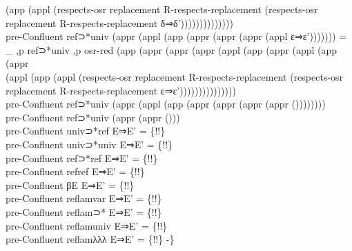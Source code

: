{\begin{code}
{\>  (app (appl (respects-osr replacement R-respects-replacement (respects-osr replacement R-respects-replacement δ⇒δ'))))))))))))))\<\\
\>pre-Confluent ref⊃*univ (appr (appl (app (appr (appr (appr (appl ε⇒ε'))))))) = \_ ,p ref⊃*univ ,p osr-red (app (appr (appr (appr (appl (app (appr (appl (app (appr \<\\
\>  (appl (app (appl (respects-osr replacement R-respects-replacement (respects-osr replacement R-respects-replacement ε⇒ε')))))))))))))))\<\\
\>pre-Confluent ref⊃*univ (appr (appl (app (appr (appr (appr (appr ())))))))\<\\
\>pre-Confluent ref⊃*univ (appr (appr ()))\<\\
\>pre-Confluent univ⊃*ref E⇒E' = \{!!\}\<\\
\>pre-Confluent univ⊃*univ E⇒E' = \{!!\}\<\\
\>pre-Confluent ref⊃*ref E⇒E' = \{!!\}\<\\
\>pre-Confluent refref E⇒E' = \{!!\}\<\\
\>pre-Confluent βE E⇒E' = \{!!\}\<\\
\>pre-Confluent reflamvar E⇒E' = \{!!\}\<\\
\>pre-Confluent reflam⊃* E⇒E' = \{!!\}\<\\
\>pre-Confluent reflamuniv E⇒E' = \{!!\}\<\\
\>pre-Confluent reflamλλλ E⇒E' = \{!!\} -\}}\<%
\\
%
\\
\> \AgdaSymbol{:}  \AgdaSymbol{\{}\AgdaSymbol{\}} \AgdaSymbol{\{}\AgdaSymbol{\}} \AgdaSymbol{\{}\AgdaSymbol{\}} \AgdaSymbol{\{} \AgdaSymbol{:}  \AgdaSymbol{\}} \AgdaSymbol{\{} \AgdaSymbol{:}   \AgdaSymbol{\}} \AgdaSymbol{\{}\AgdaSymbol{\}} \AgdaSymbol{\{}\AgdaSymbol{\}}            \AgdaFunction{Σ[}      \AgdaFunction{]}       \<%
\\
\>   \AgdaSymbol{=} \AgdaSymbol{\_}    \<%

\end{code}}
